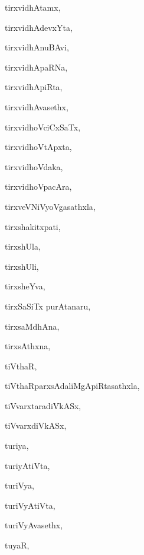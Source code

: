 \begin{multicols}{3}
{\noindent
{tirxvidhAtamx}, \pageref{tirxvidhAtamx}

\noindent
{tirxvidhAdevxYta}, \pageref{tirxvidhAdevxYta}

\noindent
{tirxvidhAnuBAvi}, \pageref{tirxvidhAnuBAvi}

\noindent
{tirxvidhApaRNa}, \pageref{tirxvidhApaRNa}

\noindent
{tirxvidhApiRta}, \pageref{tirxvidhApiRta}

\noindent
{tirxvidhAvasethx}, \pageref{tirxvidhAvasethx}

\noindent
{tirxvidhoVciCxSaTx}, \pageref{tirxvidhoVciCxSaTx}

\noindent
{tirxvidhoVtApxta}, \pageref{tirxvidhoVtApxta}

\noindent
{tirxvidhoVdaka}, \pageref{tirxvidhoVdaka}

\noindent
{tirxvidhoVpacAra}, \pageref{tirxvidhoVpacAra}

\noindent
{tirxveVNiVyoVgasathxla}, \pageref{tirxveVNiVyoVgasathxla}

\noindent
{tirxshakitxpati}, \pageref{tirxshakitxpati}

\noindent
{tirxshUla}, \pageref{tirxshUla}

\noindent
{tirxshUli}, \pageref{tirxshUli}

\noindent
{tirxsheYva}, \pageref{tirxsheYva}

\noindent
{tirxSaSiTx purAtanaru}, \pageref{tirxSaSiTx purAtanaru}

\noindent
{tirxsaMdhAna}, \pageref{tirxsaMdhAna}

\noindent
{tirxsAthxna}, \pageref{tirxsAthxna}

\noindent
{tiVthaR}, \pageref{tiVthaR}

\noindent
{tiVthaRparxsAdaliMgApiRtasathxla}, \pageref{tiVthaRparxsAdaliMgApiRtasathxla}

\noindent
{tiVvarxtaradiVkASx}, \pageref{tiVvarxtaradiVkASx}

\noindent
{tiVvarxdiVkASx}, \pageref{tiVvarxdiVkASx}

\noindent
{turiya}, \pageref{turiya}

\noindent
{turiyAtiVta}, \pageref{turiyAtiVta}

\noindent
{turiVya}, \pageref{turiVya}

\noindent
{turiVyAtiVta}, \pageref{turiVyAtiVta}

\noindent
{turiVyAvasethx}, \pageref{turiVyAvasethx}

\noindent
{tuyaR}, \pageref{tuyaR}

}
\end{multicols}
